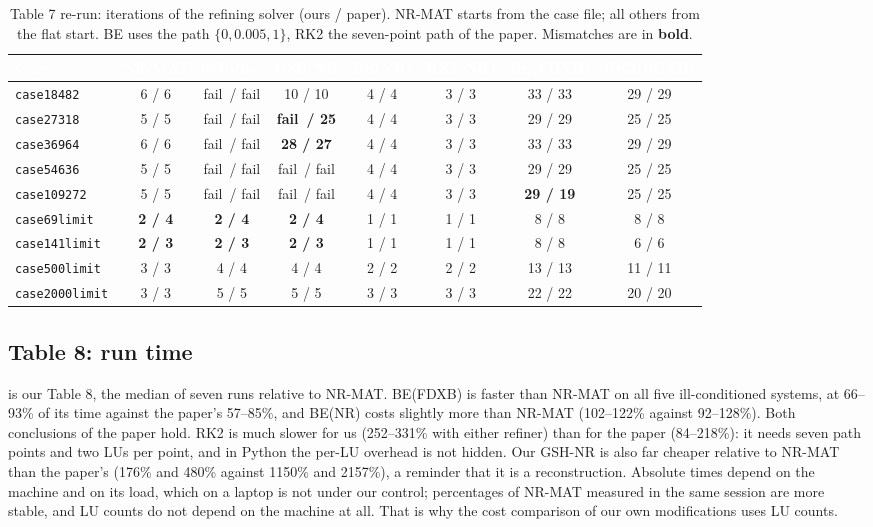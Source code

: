 \documentclass[11pt,a4paper]{article}
\newcommand{\thead}[1]{\textcolor{white}{\sffamily\bfseries\small #1}}
\newcommand{\headrow}{\rowcolor{navy}}
\newcommand{\fail}{\textcolor{failred}{fail}}
\newcommand{\code}[1]{\texttt{#1}}
\begin{document}
\begin{table}[!htbp]
\centering
\caption[Table 7 re-run: iterations of every method]{Table 7 re-run: iterations of the refining solver
(ours / paper). NR-MAT starts from the case file; all others from the flat start. BE uses the path
$\{0,0.005,1\}$, RK2 the seven-point path of the paper. Mismatches are in \textbf{bold}.}
\label{tab:t7}
\small
\setlength{\tabcolsep}{4.5pt}
\begin{tabular}{@{}l c c c c c c c@{}}
\toprule
\headrow \thead{Case} & \thead{NR-MAT} & \thead{NR-flat} & \thead{GSH-NR} & \thead{BE(NR)} & \thead{RK2(NR)} & \thead{BE(FDXB)} & \thead{RK2(FDXB)} \\
\midrule
\code{case18482}  & 6 / 6 & \fail\ / \fail & 10 / 10 & 4 / 4 & 3 / 3 & 33 / 33 & 29 / 29 \\
\code{case27318}  & 5 / 5 & \fail\ / \fail & \textbf{\fail\ / 25} & 4 / 4 & 3 / 3 & 29 / 29 & 25 / 25 \\
\code{case36964}  & 6 / 6 & \fail\ / \fail & \textbf{28 / 27} & 4 / 4 & 3 / 3 & 33 / 33 & 29 / 29 \\
\code{case54636}  & 5 / 5 & \fail\ / \fail & \fail\ / \fail & 4 / 4 & 3 / 3 & 29 / 29 & 25 / 25 \\
\code{case109272} & 5 / 5 & \fail\ / \fail & \fail\ / \fail & 4 / 4 & 3 / 3 & \textbf{29 / 19} & 25 / 25 \\
\code{case69limit}   & \textbf{2 / 4} & \textbf{2 / 4} & \textbf{2 / 4} & 1 / 1 & 1 / 1 & 8 / 8 & 8 / 8 \\
\code{case141limit}  & \textbf{2 / 3} & \textbf{2 / 3} & \textbf{2 / 3} & 1 / 1 & 1 / 1 & 8 / 8 & 6 / 6 \\
\code{case500limit}  & 3 / 3 & 4 / 4 & 4 / 4 & 2 / 2 & 2 / 2 & 13 / 13 & 11 / 11 \\
\code{case2000limit} & 3 / 3 & 5 / 5 & 5 / 5 & 3 / 3 & 3 / 3 & 22 / 22 & 20 / 20 \\
\bottomrule
\end{tabular}
\end{table}

\subsection{Table 8: run time}\label{sec:t8}
 is our Table 8, the median of seven runs relative to NR-MAT. BE(FDXB) is faster than
NR-MAT on all five ill-conditioned systems, at 66--93\% of its time against the paper's 57--85\%, and
BE(NR) costs slightly more than NR-MAT (102--122\% against 92--128\%). Both conclusions of the paper hold.
RK2 is much slower for us (252--331\% with either refiner) than for the paper (84--218\%): it needs seven
path points and two LUs per point, and in Python the per-LU overhead is not hidden. Our GSH-NR is also far
cheaper relative to NR-MAT than the paper's (176\% and 480\% against 1150\% and 2157\%), a reminder that it
is a reconstruction. Absolute times depend on the machine and on its load, which on a laptop is not under
our control; percentages of NR-MAT measured in the same session are more stable, and LU counts do not
depend on the machine at all. That is why the cost comparison of our own modifications uses LU counts.
\end{document}
